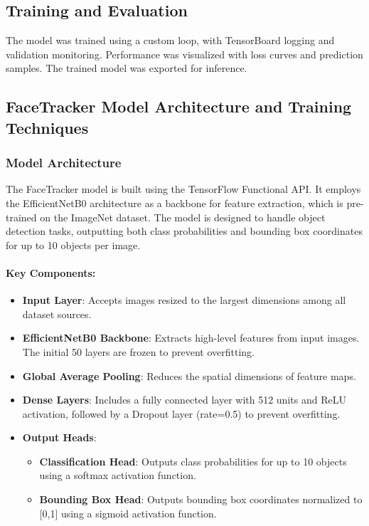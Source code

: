 \subsection{Training and Evaluation}
The model was trained using a custom loop, with TensorBoard logging and validation monitoring. Performance was visualized with loss curves and prediction samples. The trained model was exported for inference.

\subsection{FaceTracker Model Architecture and Training Techniques}

\subsubsection{Model Architecture}
The FaceTracker model is built using the TensorFlow Functional API. It employs the EfficientNetB0 architecture as a backbone for feature extraction, which is pre-trained on the ImageNet dataset. The model is designed to handle object detection tasks, outputting both class probabilities and bounding box coordinates for up to 10 objects per image.

\paragraph{Key Components:}
\begin{itemize}
    \item \textbf{Input Layer}: Accepts images resized to the largest dimensions among all dataset sources.
    \item \textbf{EfficientNetB0 Backbone}: Extracts high-level features from input images. The initial 50 layers are frozen to prevent overfitting.
    \item \textbf{Global Average Pooling}: Reduces the spatial dimensions of feature maps.
    \item \textbf{Dense Layers}: Includes a fully connected layer with 512 units and ReLU activation, followed by a Dropout layer (rate=0.5) to prevent overfitting.
    \item \textbf{Output Heads}:
    \begin{itemize}
        \item \textbf{Classification Head}: Outputs class probabilities for up to 10 objects using a softmax activation function.
        \item \textbf{Bounding Box Head}: Outputs bounding box coordinates normalized to [0,1] using a sigmoid activation function.
    \end{itemize}
\end{itemize}

